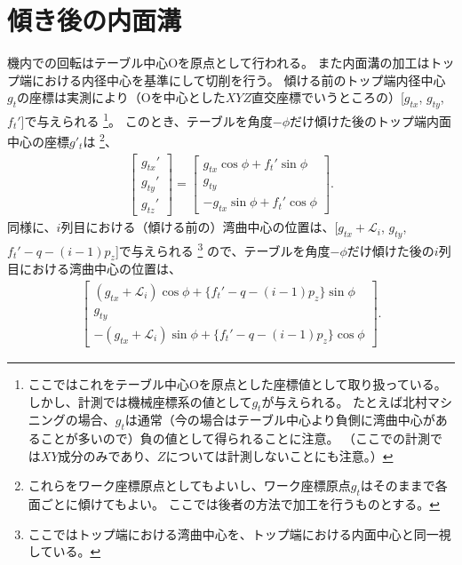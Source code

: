 \section{傾き後の内面溝}
機内での回転はテーブル中心Oを原点として行われる。
また内面溝の加工はトップ端における内径中心を基準にして切削を行う。
傾ける前のトップ端内径中心$g_t$の座標は実測により（Oを中心とした$XYZ$直交座標でいうところの）[$g_{tx}$, $g_{ty}$, $f_t'$]で与えられる
\footnote{ここではこれをテーブル中心Oを原点とした座標値として取り扱っている。
しかし、計測では機械座標系の値として$g_t$が与えられる。
たとえば北村マシニングの場合、$g_t$は通常（今の場合はテーブル中心より負側に湾曲中心があることが多いので）負の値として得られることに注意。
（ここでの計測では$XY$成分のみであり、$Z$については計測しないことにも注意。）}。
このとき、テーブルを角度$-\phi$だけ傾けた後のトップ端内面中心の座標$g'_t$は
\footnote{これらをワーク座標原点としてもよいし、ワーク座標原点$g_t$はそのままで各面ごとに傾けてもよい。
ここでは後者の方法で加工を行うものとする。}、
\begin{align*}
  \left[
  \begin{array}{c}
    g_{tx}'\\
    g_{ty}'\\
    g_{tz}'
  \end{array}
  \right]
  =\left[
   \begin{array}{c}
     g_{tx}\cos\phi+f_t'\sin\phi\\
     g_{ty}\\
     -g_{tx}\sin\phi+f_t'\cos\phi
   \end{array}
   \right].
\end{align*}
同様に、$i$列目における（傾ける前の）湾曲中心の位置は、[$g_{tx}+\mathcal L_i$, $g_{ty}$, $f_t'-q-(i-1)p_z$]で与えられる
\footnote{ここではトップ端における湾曲中心を、トップ端における内面中心と同一視している。}
ので、テーブルを角度$-\phi$だけ傾けた後の$i$列目における湾曲中心の位置は、
\begin{align*}
  \left[
  \begin{array}{c}
    (g_{tx}+\mathcal L_i)\cos\phi+\{f_t'-q-(i-1)p_z\}\sin\phi\\
    g_{ty}\\
    -(g_{tx}+\mathcal L_i)\sin\phi+\{f_t'-q-(i-1)p_z\}\cos\phi
  \end{array}
  \right].
\end{align*}
